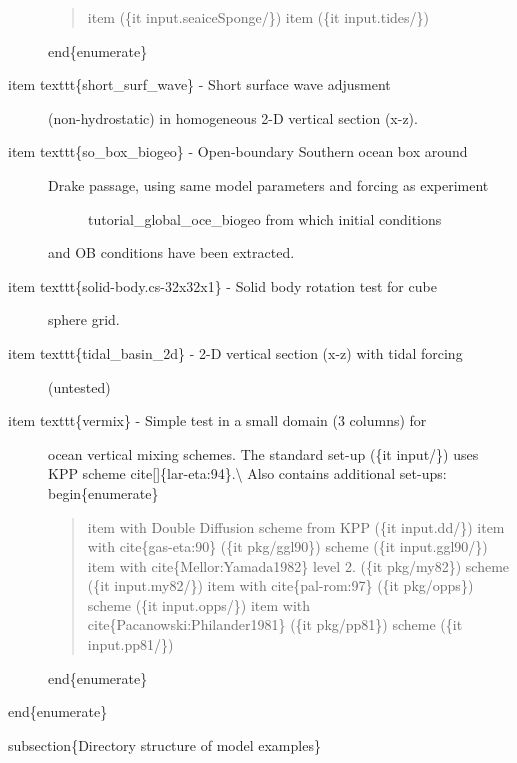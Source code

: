 \documentclass[letterpaper,10pt,english]{sphinxmanual}
\begin{document}
\begin{description}
\begin{quote}
item (\{it input.seaiceSponge/\})
item (\{it input.tides/\})
\end{quote}

end\{enumerate\}

\item[{item texttt\{short\_surf\_wave\} - Short surface wave adjusment}] \leavevmode
(non-hydrostatic) in homogeneous 2-D vertical section (x-z).

\item[{item texttt\{so\_box\_biogeo\} - Open-boundary Southern ocean box around}] \leavevmode\begin{description}
\item[{Drake passage, using same model parameters and forcing as experiment}] \leavevmode
\sphinxquotedblleft{}tutorial\_global\_oce\_biogeo\sphinxquotedblright{} from which initial conditions

\end{description}

and OB conditions have been extracted.

\item[{item texttt\{solid-body.cs-32x32x1\} - Solid body rotation test for cube}] \leavevmode
sphere grid.

\item[{item texttt\{tidal\_basin\_2d\} - 2-D vertical section (x-z) with tidal forcing}] \leavevmode
(untested)

\item[{item texttt\{vermix\} - Simple test in a small domain (3 columns) for}] \leavevmode
ocean vertical mixing schemes. The standard set-up (\{it input/\}) uses
KPP scheme cite{[}{]}\{lar-eta:94\}.\textbackslash{}
Also contains additional set-ups:
begin\{enumerate\}
\begin{quote}

item with Double Diffusion scheme from KPP (\{it input.dd/\})
item with cite\{gas-eta:90\} (\{it pkg/ggl90\}) scheme (\{it input.ggl90/\})
item with cite\{Mellor:Yamada1982\} level 2. (\{it pkg/my82\}) scheme (\{it input.my82/\})
item with cite\{pal-rom:97\} (\{it pkg/opps\}) scheme (\{it input.opps/\})
item with cite\{Pacanowski:Philander1981\} (\{it pkg/pp81\}) scheme (\{it input.pp81/\})
\end{quote}

end\{enumerate\}

\end{description}

end\{enumerate\}

subsection\{Directory structure of model examples\}
\end{document}
